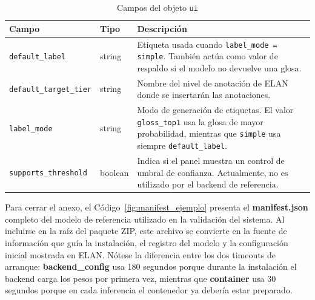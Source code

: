 \begin{table}[H]
\centering
\caption{Campos del objeto \texttt{ui}}
\label{tab:manifest_ui}
\scriptsize
\renewcommand{\arraystretch}{1.08}
\setlength{\tabcolsep}{4pt}

\begin{tabular}{
    >{\raggedright\arraybackslash}p{3.5cm}
    >{\raggedright\arraybackslash}p{1.7cm}
    >{\raggedright\arraybackslash}p{8.0cm}
}
\toprule
\textbf{Campo} & \textbf{Tipo} & \textbf{Descripción} \\
\midrule
\texttt{default\_label} & string & Etiqueta usada cuando \texttt{label\_mode = simple}. También actúa como valor de respaldo si el modelo no devuelve una glosa. \\
\texttt{default\_target\_tier} & string & Nombre del nivel de anotación de ELAN donde se insertarán las anotaciones. \\
\texttt{label\_mode} & string & Modo de generación de etiquetas. El valor \texttt{gloss\_top1} usa la glosa de mayor probabilidad, mientras que \texttt{simple} usa siempre \texttt{default\_label}. \\
\texttt{supports\_threshold} & boolean & Indica si el panel muestra un control de umbral de confianza. Actualmente, no es utilizado por el backend de referencia. \\
\bottomrule
\end{tabular}
\end{table}

Para cerrar el anexo, el Código~\ref{fig:manifest_ejemplo} presenta el \textbf{manifest.json} completo del modelo de referencia utilizado en la validación del sistema. Al incluirse en la raíz del paquete ZIP, este archivo se convierte en la fuente de información que guía la instalación, el registro del modelo y la configuración inicial mostrada en ELAN. Nótese la diferencia entre los dos timeouts de arranque: \textbf{backend\_config} usa 180 segundos porque durante la instalación el backend carga los pesos por primera vez, mientras que \textbf{container} usa 30 segundos porque en cada inferencia el contenedor ya debería estar preparado.

